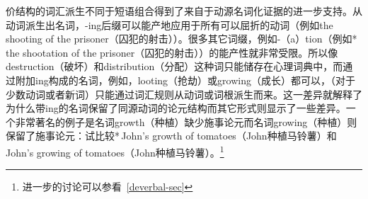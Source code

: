 
    价结构的词汇派生不同于短语组合得到了来自于动源名词化证据的进一步支持\citep{Wechsler2008a}。从动词派生出名词，-ing后缀可以能产地应用于所有可以屈折的动词（例如the shooting of the prisoner（囚犯的射击））。很多其它词缀，例如-（a）tion（例如*\,the shootation of the prisoner（囚犯的射击））的能产性就非常受限。所以像destruction（破坏）和distribution（分配）这种词只能储存在心理词典中，而通过附加ing构成的名词，例如，looting（抢劫）或growing（成长）都可以，（对于少数动词或者新词）只能通过词汇规则从动词或词根派生而来\citep{Zucchi93a-u}。这一差异就解释了为什么带ing的名词保留了同源动词的论元结构而其它形式则显示了一些差异。一个非常著名的例子是名词growth（种植）缺少施事论元而名词growing（种植）则保留了施事论元：试比较*\,John's growth of tomatoes（John种植马铃薯）和John's growing of tomatoes（John种植马铃薯）\citep{Chomsky70a}。\footnote{进一步的讨论可以参看~\ref{deverbal-sec}} 
